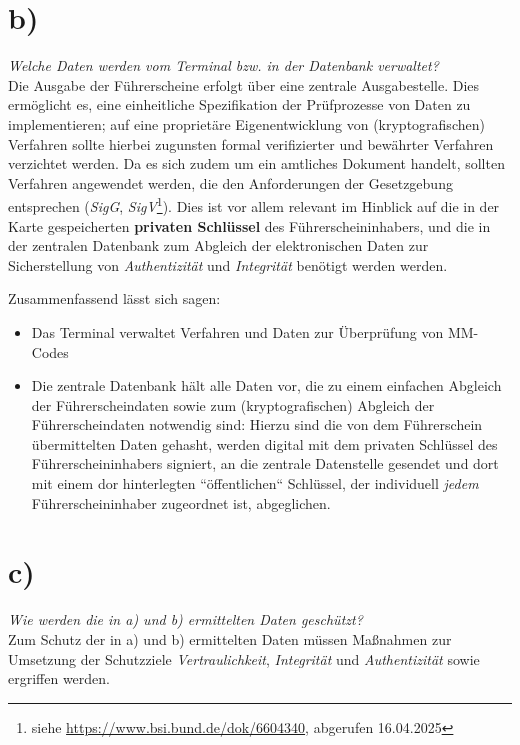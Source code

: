 \section{b)}

\textit{Welche Daten werden vom Terminal bzw. in der Datenbank verwaltet?}\\

\noindent
Die Ausgabe der Führerscheine erfolgt über eine zentrale Ausgabestelle.
Dies ermöglicht es, eine einheitliche Spezifikation der Prüfprozesse von Daten zu implementieren; auf eine proprietäre Eigenentwicklung von (kryptografischen) Verfahren sollte hierbei zugunsten formal verifizierter und bewährter Verfahren verzichtet werden.
Da es sich zudem um ein amtliches Dokument handelt, sollten Verfahren angewendet werden, die den Anforderungen der Gesetzgebung entsprechen (\textit{SigG}, \textit{SigV}\footnote{
siehe \url{https://www.bsi.bund.de/dok/6604340}, abgerufen 16.04.2025
}).
Dies ist vor allem relevant im Hinblick auf die in der Karte gespeicherten \textbf{privaten Schlüssel} des Führerscheininhabers, und die in der zentralen Datenbank zum Abgleich der elektronischen Daten zur Sicherstellung von \textit{Authentizität} und \textit{Integrität} benötigt werden werden.

Zusammenfassend lässt sich sagen:

\begin{itemize}
    \itemsep0.5em
    \item Das Terminal verwaltet Verfahren und Daten zur Überprüfung von MM-Codes
    \item Die zentrale Datenbank hält alle Daten vor, die zu einem einfachen Abgleich der Führerscheindaten sowie zum (kryptografischen) Abgleich der Führerscheindaten notwendig sind: Hierzu sind die von dem Führerschein übermittelten Daten gehasht, werden digital mit dem privaten Schlüssel des Führerscheininhabers signiert, an die zentrale Datenstelle gesendet und dort mit einem dor hinterlegten ``öffentlichen`` Schlüssel, der individuell \textit{jedem} Führerscheininhaber zugeordnet ist, abgeglichen.
\end{itemize}


\section{c)}

\textit{Wie werden die in a) und b) ermittelten Daten geschützt?}\\

\noindent
Zum Schutz der in a) und b) ermittelten Daten müssen Maßnahmen zur Umsetzung der Schutzziele \textit{Vertraulichkeit}, \textit{Integrität} und \textit{Authentizität} sowie  ergriffen werden.\\

